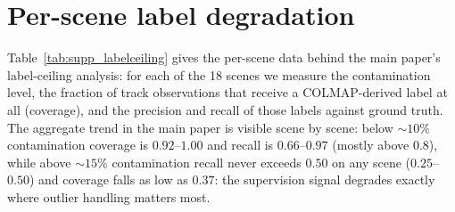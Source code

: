 \documentclass{article}
\begin{document}
\section{Per-scene label degradation}\label{app:labeldeg}
Table~\ref{tab:supp_labelceiling} gives the per-scene data behind the main paper's
label-ceiling analysis: for each of the 18 scenes we measure the contamination level, the
fraction of track observations that receive a COLMAP-derived label at all (coverage), and
the precision and recall of those labels against ground truth. The aggregate trend in the main paper is visible scene by scene: below ${\sim}10\%$ contamination coverage is $0.92$--$1.00$ and recall is $0.66$--$0.97$ (mostly above $0.8$), while above ${\sim}15\%$ contamination recall never exceeds $0.50$ on any scene ($0.25$--$0.50$) and coverage falls as low as $0.37$: the supervision signal degrades exactly where outlier handling matters most.
\end{document}
